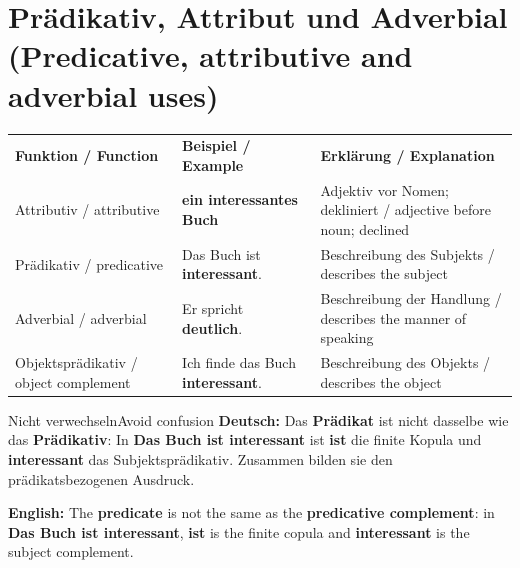 \documentclass[a4paper,11pt]{article}
\newcommand{\GermanText}[1]{\textbf{Deutsch: }#1\par}
\newcommand{\EnglishText}[1]{{\small\color{SoftGray}\textbf{English: }#1\par}}
\begin{document}
\section{Prädikativ, Attribut und Adverbial \textnormal{(Predicative, attributive and adverbial uses)}}
\begin{longtable}{>{\raggedright\arraybackslash}p{3.1cm}|>{\raggedright\arraybackslash}p{5.4cm}|>{\raggedright\arraybackslash}p{5.2cm}}
\rowcolor{HeaderBlueDark}
\color{white}\textbf{Funktion / Function} & \color{white}\textbf{Beispiel / Example} & \color{white}\textbf{Erklärung / Explanation}\\
Attributiv / attributive & \textbf{ein interessantes Buch} & Adjektiv vor Nomen; dekliniert / adjective before noun; declined\\
Prädikativ / predicative & Das Buch ist \textbf{interessant}. & Beschreibung des Subjekts / describes the subject\\
Adverbial / adverbial & Er spricht \textbf{deutlich}. & Beschreibung der Handlung / describes the manner of speaking\\
Objektsprädikativ / object complement & Ich finde das Buch \textbf{interessant}. & Beschreibung des Objekts / describes the object\\
\end{longtable}
\begin{grammarentry}{Nicht verwechseln}{Avoid confusion}
\GermanText{Das \textbf{Prädikat} ist nicht dasselbe wie das \textbf{Prädikativ}: In \textbf{Das Buch ist interessant} ist \textbf{ist} die finite Kopula und \textbf{interessant} das Subjektsprädikativ. Zusammen bilden sie den prädikatsbezogenen Ausdruck.}
\EnglishText{The \textbf{predicate} is not the same as the \textbf{predicative complement}: in \textbf{Das Buch ist interessant}, \textbf{ist} is the finite copula and \textbf{interessant} is the subject complement.}
\end{grammarentry}
\end{document}
